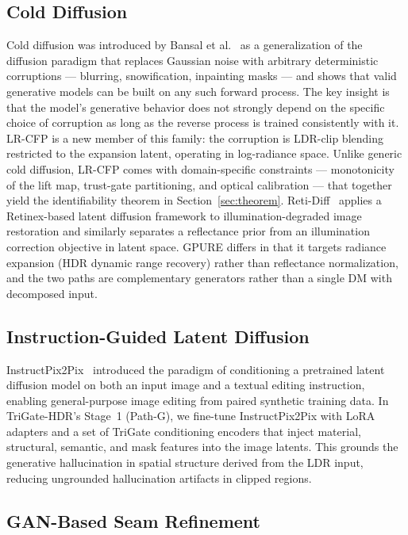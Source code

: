 \documentclass[10pt,twocolumn,letterpaper]{article}
\begin{document}
\subsection{Cold Diffusion}

Cold diffusion was introduced by Bansal et al.~\cite{colddiffusion} as a generalization of the diffusion paradigm that replaces Gaussian noise with arbitrary deterministic corruptions --- blurring, snowification, inpainting masks --- and shows that valid generative models can be built on any such forward process. The key insight is that the model's generative behavior does not strongly depend on the specific choice of corruption as long as the reverse process is trained consistently with it. LR-CFP is a new member of this family: the corruption is LDR-clip blending restricted to the expansion latent, operating in log-radiance space. Unlike generic cold diffusion, LR-CFP comes with domain-specific constraints --- monotonicity of the lift map, trust-gate partitioning, and optical calibration --- that together yield the identifiability theorem in Section~\ref{sec:theorem}. Reti-Diff~\cite{retidiff} applies a Retinex-based latent diffusion framework to illumination-degraded image restoration and similarly separates a reflectance prior from an illumination correction objective in latent space. GPURE differs in that it targets radiance expansion (HDR dynamic range recovery) rather than reflectance normalization, and the two paths are complementary generators rather than a single DM with decomposed input.

\subsection{Instruction-Guided Latent Diffusion}

InstructPix2Pix~\cite{instructpix2pix} introduced the paradigm of conditioning a pretrained latent diffusion model on both an input image and a textual editing instruction, enabling general-purpose image editing from paired synthetic training data. In TriGate-HDR's Stage~1 (Path-G), we fine-tune InstructPix2Pix with LoRA~\cite{lora} adapters and a set of TriGate conditioning encoders that inject material, structural, semantic, and mask features into the image latents. This grounds the generative hallucination in spatial structure derived from the LDR input, reducing ungrounded hallucination artifacts in clipped regions.

\subsection{GAN-Based Seam Refinement}
\end{document}
